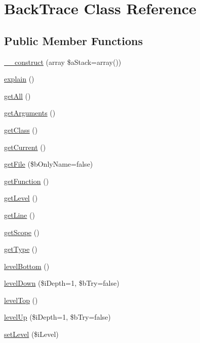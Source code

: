 \hypertarget{class_back_trace}{
\section{BackTrace Class Reference}
\label{class_back_trace}
}
\subsection*{Public Member Functions}
\begin{CompactItemize}
\item 
\hyperlink{class_back_trace_e81810ff23f1543976f5d3eacbfeeb29}{\_\-\_\-construct} (array \$aStack=array())
\item 
\hyperlink{class_back_trace_d5d0eb4a7673238105f5ed4734523428}{explain} ()
\item 
\hyperlink{class_back_trace_ba0d5b303383fb5b1fabb5fd01cd3800}{getAll} ()
\item 
\hyperlink{class_back_trace_1d4c324c5a088be98d99d3efbf3502e1}{getArguments} ()
\item 
\hyperlink{class_back_trace_23ecbde357f7f6bde5a50f876334a74d}{getClass} ()
\item 
\hyperlink{class_back_trace_d926899d7cac34a3f1a90e552d8eb27d}{getCurrent} ()
\item 
\hyperlink{class_back_trace_932d18f80cc26b50d2855ce5925a385a}{getFile} (\$bOnlyName=false)
\item 
\hyperlink{class_back_trace_3cb728ca27acfebd282caecdb8a1f5fc}{getFunction} ()
\item 
\hyperlink{class_back_trace_23fac327059bf3fd0fe57555252d8cf2}{getLevel} ()
\item 
\hyperlink{class_back_trace_ef9c32f6066788a101028a1d4150f8cb}{getLine} ()
\item 
\hyperlink{class_back_trace_0dce4e854dda57ffc316fd755df9b309}{getScope} ()
\item 
\hyperlink{class_back_trace_830b5c75df72b32396701bc563fbe3c7}{getType} ()
\item 
\hyperlink{class_back_trace_947fed0ee4bf21433d5bc900cc2f7547}{levelBottom} ()
\item 
\hyperlink{class_back_trace_abf1c1a9c1222e9ff2abb2dc29e7b610}{levelDown} (\$iDepth=1, \$bTry=false)
\item 
\hyperlink{class_back_trace_6991034797ac2852fc2f487f12d0993c}{levelTop} ()
\item 
\hyperlink{class_back_trace_89e47a095ea0bb56352b6fdf68740eb0}{levelUp} (\$iDepth=1, \$bTry=false)
\item 
\hyperlink{class_back_trace_ecef87c7823ef2809065c1544f7a57e9}{setLevel} (\$iLevel)
\end{CompactItemize}
